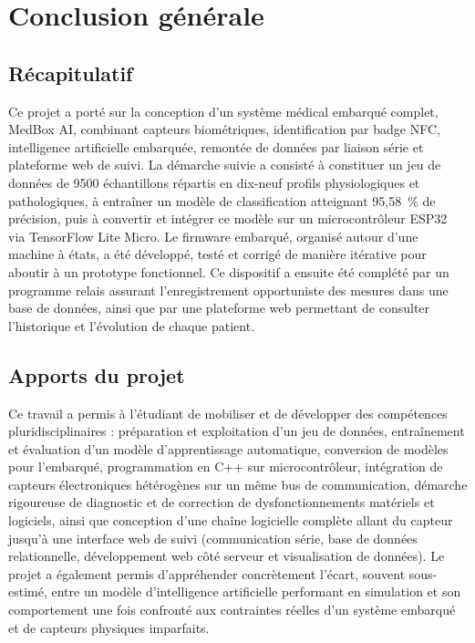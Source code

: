 \documentclass[12pt,a4paper]{report}
\begin{document}
\chapter{Conclusion générale}

\section{Récapitulatif}
Ce projet a porté sur la conception d'un système médical embarqué complet, MedBox AI, combinant capteurs biométriques, identification par badge NFC, intelligence artificielle embarquée, remontée de données par liaison série et plateforme web de suivi. La démarche suivie a consisté à constituer un jeu de données de 9500 échantillons répartis en dix-neuf profils physiologiques et pathologiques, à entraîner un modèle de classification atteignant 95,58~\% de précision, puis à convertir et intégrer ce modèle sur un microcontrôleur ESP32 via TensorFlow Lite Micro. Le firmware embarqué, organisé autour d'une machine à états, a été développé, testé et corrigé de manière itérative pour aboutir à un prototype fonctionnel. Ce dispositif a ensuite été complété par un programme relais assurant l'enregistrement opportuniste des mesures dans une base de données, ainsi que par une plateforme web permettant de consulter l'historique et l'évolution de chaque patient.

\section{Apports du projet}
Ce travail a permis à l'étudiant de mobiliser et de développer des compétences pluridisciplinaires : préparation et exploitation d'un jeu de données, entraînement et évaluation d'un modèle d'apprentissage automatique, conversion de modèles pour l'embarqué, programmation en C++ sur microcontrôleur, intégration de capteurs électroniques hétérogènes sur un même bus de communication, démarche rigoureuse de diagnostic et de correction de dysfonctionnements matériels et logiciels, ainsi que conception d'une chaîne logicielle complète allant du capteur jusqu'à une interface web de suivi (communication série, base de données relationnelle, développement web côté serveur et visualisation de données). Le projet a également permis d'appréhender concrètement l'écart, souvent sous-estimé, entre un modèle d'intelligence artificielle performant en simulation et son comportement une fois confronté aux contraintes réelles d'un système embarqué et de capteurs physiques imparfaits.
\end{document}

